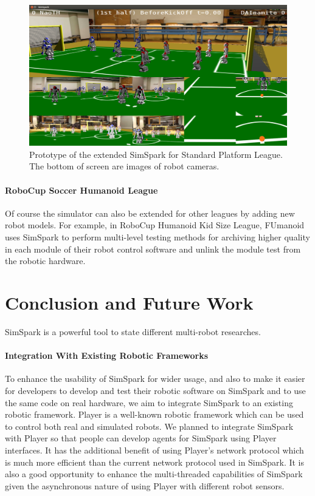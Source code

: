 \documentclass{llncs}
\begin{document}
\begin{figure}
  \centering
  \includegraphics[width = 0.75\columnwidth]{simspark-spl}
  \caption{Prototype of the extended SimSpark for Standard Platform League.
    The bottom of screen are images of robot cameras.}
  \label{f:simspark-spl}
\end{figure}

\paragraph{RoboCup Soccer Humanoid League}
Of course the simulator can also be extended for other leagues by adding new robot models.
For example, in RoboCup Humanoid Kid Size League, FUmanoid\cite{Donat2012} uses
SimSpark to perform multi-level testing methods for archiving higher
quality in each module of their robot control software and unlink the
module test from the robotic hardware.


\section{Conclusion and Future Work}
\label{s:conclusion}
SimSpark is a powerful tool to state different multi-robot researches.

\paragraph{Integration With Existing Robotic Frameworks}
To enhance the usability of SimSpark for wider usage, and also to make it easier
for developers to develop and test their robotic software on SimSpark and to
use the same code on real hardware, we aim to integrate SimSpark to an 
existing robotic framework. Player is a well-known robotic framework which
can be used to control both real and simulated robots. We planned to integrate
SimSpark with Player so that people can develop agents for SimSpark using 
Player interfaces. It has the additional benefit of using Player's network
protocol which is much more efficient than the current network protocol used
in SimSpark. It is also a good opportunity to enhance the multi-threaded 
capabilities of SimSpark given the asynchronous nature of using Player with
different robot sensors. 
\end{document}
